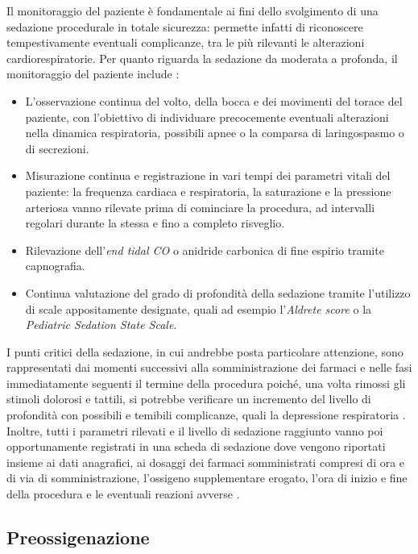 Il monitoraggio del paziente è fondamentale ai fini dello svolgimento di una sedazione procedurale in totale sicurezza: permette infatti di riconoscere tempestivamente eventuali complicanze, tra le più rilevanti le alterazioni cardiorespiratorie. 
Per quanto riguarda la sedazione da moderata a profonda, il monitoraggio del paziente include \cite{Krauss2006, Simeupsedazione}: 

\begin{itemize}
    \item L'osservazione continua del volto, della bocca e dei movimenti del torace del paziente, con l'obiettivo di individuare precocemente eventuali alterazioni nella dinamica respiratoria, possibili apnee o la comparsa di laringospasmo o di secrezioni.
    \item Misurazione continua e registrazione in vari tempi dei parametri vitali del paziente: la frequenza cardiaca e respiratoria, la saturazione e la pressione arteriosa vanno rilevate prima di cominciare la procedura, ad intervalli regolari durante la stessa e fino a completo risveglio. 
    \item Rilevazione dell'\emph{end tidal CO} o anidride carbonica di fine espirio tramite capnografia.
    \item Continua valutazione del grado di profondità della sedazione tramite l'utilizzo di scale appositamente designate, quali ad esempio l'\emph{Aldrete score} o la \emph{Pediatric Sedation State Scale}.
\end{itemize} 

I punti critici della sedazione, in cui andrebbe posta particolare attenzione, sono rappresentati dai momenti successivi alla somministrazione dei farmaci e nelle fasi immediatamente seguenti il termine della procedura poiché, una volta rimossi gli stimoli dolorosi e tattili, si potrebbe verificare un incremento del livello di profondità con possibili e temibili complicanze, quali la depressione respiratoria \cite{Daud2014}. 
\\Inoltre, tutti i parametri rilevati e il livello di sedazione raggiunto vanno poi opportunamente registrati in una scheda di sedazione dove vengono riportati insieme ai dati anagrafici, ai dosaggi dei farmaci somministrati compresi di ora e di via di somministrazione, l'ossigeno supplementare erogato, l'ora di inizio e fine della procedura e le eventuali reazioni avverse \cite{Guidelines2019, Simeupsedazione}. 

\subsection*{Preossigenazione}

